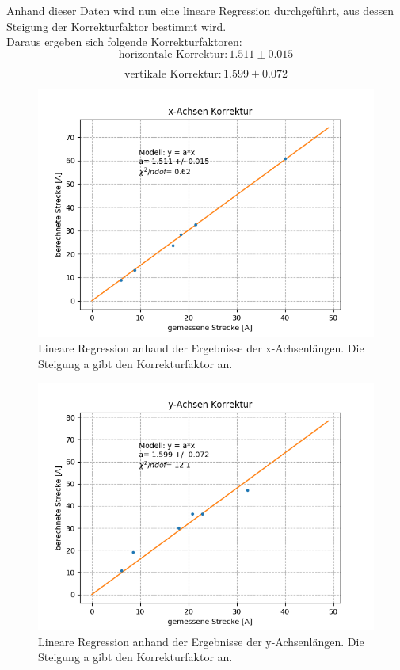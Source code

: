 \documentclass[12pt,a4paper]{article}
\begin{document}
Anhand dieser Daten wird nun eine lineare Regression durchgeführt, aus dessen Steigung der Korrekturfaktor bestimmt wird.\\
Daraus ergeben sich folgende Korrekturfaktoren:
\begin{equation*}
\boxed{\textrm{horizontale Korrektur}: 1.511\pm 0.015}
\end{equation*}

\begin{equation*}
\boxed{\textrm{vertikale Korrektur}: 1.599\pm 0.072}
\end{equation*}

\begin{figure}
\centering
\includegraphics[scale=0.9]{Bilder/xAchse.png}
\caption{Lineare Regression anhand der Ergebnisse der x-Achsenlängen. Die Steigung a gibt den Korrekturfaktor an.}
\label{fig:strom2_abstand}
\end{figure}

\begin{figure}
\centering
\includegraphics[scale=0.9]{Bilder/yAchse.png}
\caption{Lineare Regression anhand der Ergebnisse der y-Achsenlängen. Die Steigung a gibt den Korrekturfaktor an.}
\label{fig:strom2_abstand}
\end{figure}
\end{document}
